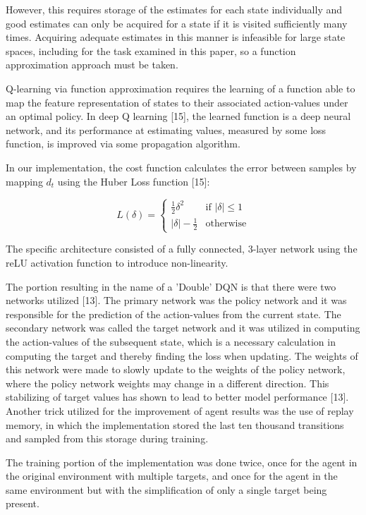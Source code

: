 \documentclass{article}
\begin{document}
	However, this requires storage of the estimates for each state individually and good estimates can only be acquired for a state if it is visited sufficiently many times. Acquiring adequate estimates in this manner is infeasible for large state spaces, including for the task examined in this paper, so a function approximation approach must be taken.
	
	Q-learning via function approximation requires the learning of a function able to map the feature representation of states to their associated action-values under an optimal policy. In deep Q learning [15], the learned function is a deep neural network, and its performance at estimating values, measured by some loss function, is improved via some propagation algorithm.
	
	In our implementation, the cost function calculates the error between samples by mapping $d_{t}$ using the Huber Loss function [15]:
	
	\begin{equation}
		L(\delta)=
		\begin{cases}
			\frac{1}{2}\delta^{2} & \text{if  } |\delta| \leq 1\\
			|\delta| - \frac{1}{2} & \text{otherwise} 
		\end{cases}
	\end{equation}
	
	The specific architecture consisted of a fully connected, 3-layer network using the reLU activation function to introduce non-linearity.
	
	The portion resulting in the name of a 'Double' DQN is that there were two networks utilized [13]. The primary network was the policy network and it was responsible for the prediction of the action-values from the current state. The secondary network was called the target network and it was utilized in computing the action-values of the subsequent state, which is a necessary calculation in computing the target and thereby finding the loss when updating. The weights of this network were made to slowly update to the weights of the policy network, where the policy network weights may change in a different direction. This stabilizing of target values has shown to lead to better model performance [13]. Another trick utilized for the improvement of agent results was the use of replay memory, in which the implementation stored the last ten thousand transitions and sampled from this storage during training.
	
	The training portion of the implementation was done twice, once for the agent in the original environment with multiple targets, and once for the agent in the same environment but with the simplification of only a single target being present.
	
\end{document}
